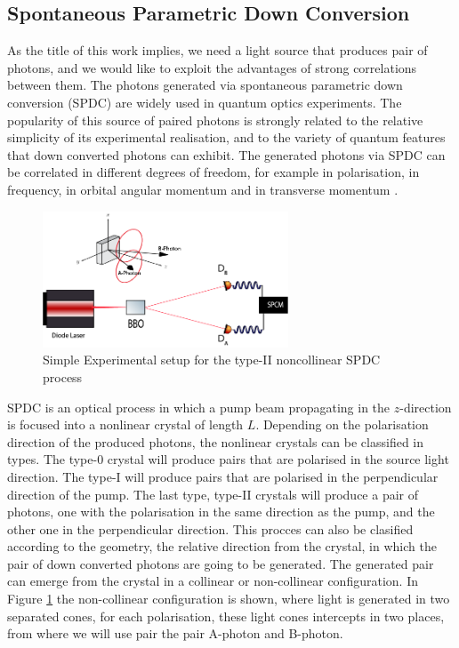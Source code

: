 \subsection{Spontaneous Parametric Down Conversion}

As the title of this work implies, we need a light source that produces pair of photons, 
and we would like to exploit the advantages of strong correlations between them.
The photons generated via spontaneous parametric down conversion (SPDC) are
widely used in quantum optics experiments. The popularity of this source of paired
photons is strongly related to the relative simplicity of its experimental
realisation, and to the variety of quantum features that down converted photons can exhibit. 
The generated photons via SPDC can be correlated in different degrees of freedom, for example 
in polarisation, in frequency, in orbital angular momentum and in transverse momentum \cite{spatiocorrelations}.\\

\begin{figure}[h!]
\centering
\label{fig:spdcSimple}
 \includegraphics[width=0.65\textwidth]{Figures/spdcSimple.png}
 \caption{Simple Experimental setup for the type-II noncollinear SPDC process} 
\end{figure}


SPDC is an optical process in which a pump beam propagating in the $z$-direction is focused into a nonlinear crystal of length $L$. 
Depending on the polarisation direction of the produced photons, the nonlinear crystals 
can be classified in types. 
The type-0 crystal will produce pairs that are polarised in the source light direction. 
The type-I will produce pairs that are polarised in the perpendicular direction of the pump. 
The last type, type-II crystals will produce a pair of photons, 
one with the polarisation in the same direction as the pump, 
and the other one in the perpendicular direction. 
This procces can also be clasified according to the geometry, the relative direction from the crystal,
 in which the pair of down converted photons are going to be generated. The generated
 pair can emerge from the crystal in a collinear or non-collinear configuration. 
In Figure \ref{fig:spdcSimple} the non-collinear configuration is shown, where light is generated in two separated 
cones, for each polarisation, these light cones intercepts in two places, from where we will use pair the pair A-photon and B-photon.

